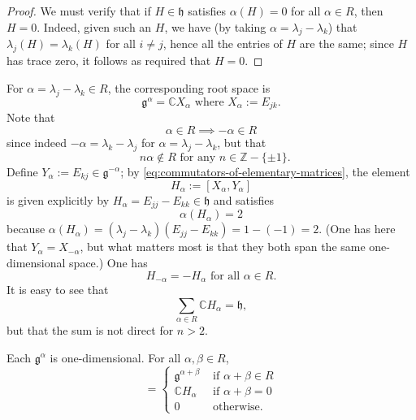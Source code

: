 \documentclass[reqno]{amsart} 
\begin{document}
\begin{proof}
  We must verify that if $H \in \mathfrak{h}$ satisfies $\alpha(H) = 0$ for all $\alpha \in R$, then $H = 0$.  Indeed, given such an $H$, we have (by taking $\alpha = \lambda_j - \lambda_k$) that $\lambda_j(H) = \lambda_k(H)$ for all $i \neq j$, hence all the entries of $H$ are the same; since $H$ has trace zero, it follows as required that $H = 0$.
\end{proof}
For $\alpha = \lambda_j - \lambda_k \in R$, the corresponding root space is
\begin{equation*}
  \mathfrak{g}^{\alpha} = \mathbb{C} X_\alpha \text{ where } X_\alpha := E_{j k}.
\end{equation*}
Note that
\begin{equation}\label{eq:negative-roots-are-roots}
  \alpha \in R \implies - \alpha \in R
\end{equation}
since indeed $-\alpha = \lambda_k - \lambda_j$ for $\alpha = \lambda_j - \lambda_k$, but that
\begin{equation*}
\text{ $n \alpha \notin R$ for any $n \in \mathbb{Z} - \{\pm 1\}$.}
\end{equation*}
Define $Y_\alpha := E_{k j} \in \mathfrak{g}^{-\alpha}$; by \eqref{eq:commutators-of-elementary-matrices}, the element
\begin{equation*}
  H_\alpha := [X_\alpha,Y_\alpha]
\end{equation*}
is given explicitly by $H_\alpha = E_{j j} - E_{k k} \in \mathfrak{h}$ and satisfies
\begin{equation*}
  \alpha(H_\alpha) = 2
\end{equation*}
because $\alpha(H_\alpha) = (\lambda_j - \lambda_k)(E_{j j} - E_{k k}) = 1 - (-1) = 2$.  (One has here that $Y_{\alpha} = X_{-\alpha}$, but what matters most is that they both span the same one-dimensional space.)  One has
\begin{equation*}
 H_{-\alpha} = - H_\alpha \text{ for all } \alpha \in R.
\end{equation*}
 It is easy to see that
\begin{equation}\label{eq:coroots-span-cartan-slNC}
  \sum_{\alpha \in R} \mathbb{C} H_\alpha = \mathfrak{h},
\end{equation}
but that the sum is not direct for $n > 2$.
\begin{lemma}\label{lem:root-space-commutation-relations}
  Each $\mathfrak{g}^{\alpha}$ is one-dimensional.  For all $\alpha,\beta \in R$,
  \begin{equation*}
 [\mathfrak{g}^\alpha, \mathfrak{g}^\beta]
    = 
\begin{cases}
      \mathfrak{g}^{\alpha + \beta} & \text{ if } \alpha + \beta \in R \\
      \mathbb{C} H_\alpha  & \text{ if } \alpha + \beta = 0 \\
      0 & \text{ otherwise.}
    \end{cases}
  \end{equation*}
\end{lemma}
\end{document}
